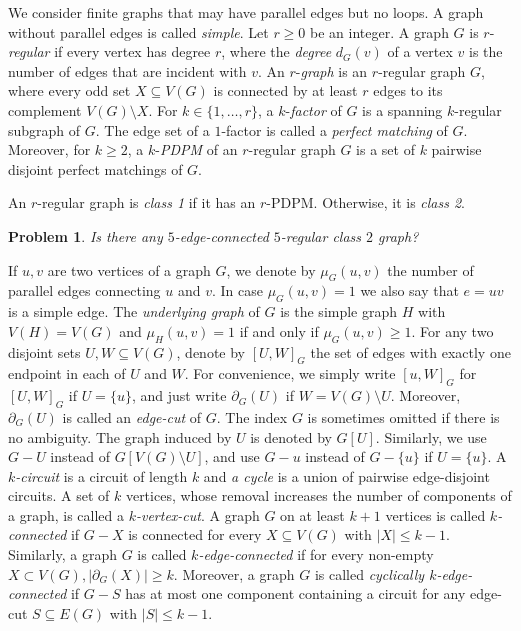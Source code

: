 
\newtheorem{defi}{Definition}[section]
\newtheorem{prob}[defi]{Problem}

We consider finite graphs that may have parallel edges but no loops. A graph without parallel edges is called \emph{simple}.
Let $r \geq 0$ be an integer. A graph $G$ is $r$-\emph{regular} if every vertex has degree $r$, where the \emph{degree} $d_G(v)$ of a vertex $v$ is the number of edges that are incident with $v$. An $r$-\emph{graph} is an $r$-regular graph $G$, where
every odd set $X \subseteq V(G)$ is connected by at least $r$ edges to its complement
$V(G) \setminus X$.
For $k \in \{1, \dots, r\}$, a $k$-\emph{factor} of $G$ is a spanning $k$-regular subgraph of $G$. The edge set of a $1$-factor is called a \emph{perfect matching} of $G$. Moreover, for $k\ge 2$, a $k$-\emph{PDPM} of an $r$-regular graph $G$ is a set of $k$ pairwise disjoint perfect matchings of $G$.

An $r$-regular graph is \emph{class 1} if it has an $r$-PDPM.
Otherwise, it is \emph{class 2}.

\begin{prob}\label{prob:5_reg_class_2}
	Is there any $5$-edge-connected $5$-regular class $2$ graph?
\end{prob}

If $u,v$ are two vertices of a graph $G$, we denote by $\mu_G(u,v)$ the number of parallel edges connecting $u$ and $v$.
In case $\mu_G(u,v)=1$ we also say that $e=uv$ is a simple edge.
The
\emph{underlying graph} of $G$ is the simple graph
$H$ with $V(H)=V(G)$ and $\mu_H(u,v)=1$ if and only if $\mu_G(u,v)  \geq 1$.
For any two disjoint sets $U,  W\subseteq V(G)$, denote by
$[U, W]_G$  the set of  edges with exactly one endpoint in each of  $U$ and $W$. For convenience, we simply write $[u,W]_G$ for $[U, W]_G$ if $U= \{u\}$, and just write $\partial_G(U)$ if $W = V(G)\setminus U$.
Moreover, $\partial_G(U)$ is called an {\em edge-cut} of $G$.
The index $G$ is sometimes omitted if there is no ambiguity.
The graph induced by $U$ is denoted by $G[U]$.  Similarly, we use $G-U$ instead of  $G[V(G)\setminus U]$, and use $G-u$ instead of $G-\{u\}$ if $U= \{u\}$. A {\em $k$-circuit} is a circuit of length $k$ and
{\em a cycle} is a union of pairwise edge-disjoint circuits.
A set of $k$ vertices, whose removal increases the number of components of a graph, is called a {\em $k$-vertex-cut}.
A graph $G$ on at least $k+1$ vertices is called {\em $k$-connected} if $G-X$ is connected for every $X\subseteq V(G)$ with $|X|\leq k-1$.
Similarly, a graph $G$ is called {\em $k$-edge-connected} if for every non-empty $X \subset V(G), |\partial_G(X)| \ge k$. Moreover, a graph $G$ is called {\em cyclically $k$-edge-connected} if $G-S$ has at most one component containing a circuit for any edge-cut $S \subseteq E(G)$ with $|S|\leq k-1$.

